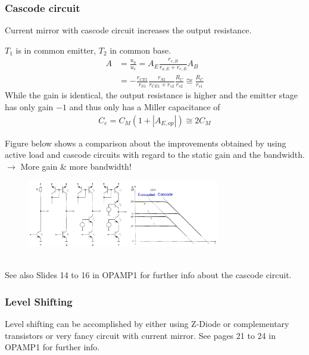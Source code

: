 		\subsubsection{Cascode circuit}
			Current mirror with cascode circuit increases the output resistance. 
			\begin{multicols}{2}
				\begin{center}
					
				\end{center}
				\vfill
				\columnbreak
				$T_1$ is in common emitter, $T_2$ in common base.
				\begin{align}
					A &= \frac{u_a}{u_e} = A_E \frac{r_{e,B}}{r_{a,E} + r_{e,B}} A_B \nonumber \\
					 &= -\frac{r_{CE1}}{r_{S1}} \frac{r_{S2}}{r_{CE1}+r_{s2}} \frac{R_C}{r_{s2}} \cong \frac{R_C}{r_{s1}}
				\end{align}
				While the gain is identical, the output resistance is higher and the emitter stage has only gain $-1$ and thus only has a Miller capacitance of
				\begin{align}
					C_e = C_M \left( 1 + |A_{E,op}| \right) \cong 2 C_M
				\end{align}
			\end{multicols}
			
			Figure below shows a comparison about the improvements obtained by using active load and cascode circuits with regard to the static gain and the bandwidth. \\
			$\rightarrow$ More gain \& more bandwidth!
			\begin{figure}[h]
				\centering
				\includegraphics[width=0.75\textwidth]{images/Comparison.png}
				\caption{}
				\label{Fig:Comparison}
			\end{figure}
			\\
			See also Slides 14 to 16 in OPAMP1 for further info about the cascode circuit. 

		\subsubsection{Level Shifting}
			Level shifting can be accomplished by either using Z-Diode or complementary transistors or very fancy circuit with current mirror. 
			See pages 21 to 24 in OPAMP1 for further info. 
			
